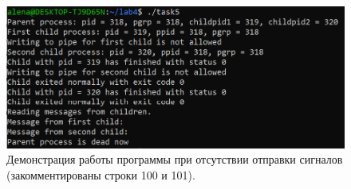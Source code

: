 \documentclass[12pt]{report}
\begin{document}
\begin{figure}[H]
	
	\centering
	
	\includegraphics[width=\linewidth]{img/task05_02.png}
	\caption{Демонстрация работы программы при отсутствии отправки сигналов (закомментированы строки 100 и 101).}
	
	\label{fig:task05_01}
	
\end{figure}



\end{document}
